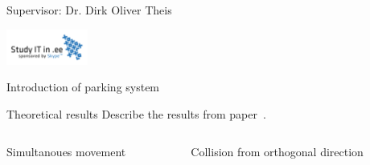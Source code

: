 \begin{frame}[plain]
    \titlepage
    \centerline{\scriptsize Supervisor: Dr. Dirk Oliver Theis}
    \hfill \includegraphics[width=0.2\textwidth]{fig/ITA_small-logo-eng.png}
\end{frame}

\begin{frame}{Introduction of parking system}
\end{frame}

\begin{frame}{Theoretical results}
    Describe the results from paper~.
\end{frame}

\begin{frame}
    \begin{columns}
        \begin{column}{0.4\textwidth}
            \begin{block}{Simultanoues movement}
                
            \end{block}
        \end{column}
        \begin{column}{0.4\textwidth}
            \begin{block}{Collision from orthogonal direction}
                
            \end{block}
        \end{column}
    \end{columns}
\end{frame}

\begin{frame}{}
\end{frame}
